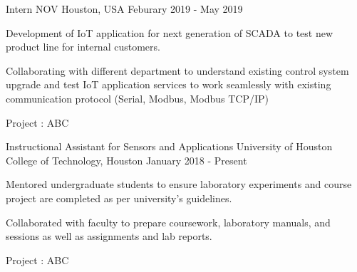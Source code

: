 \begin{cventries}
	\cventry
	{Intern} %
	{NOV} %
	{Houston, USA} %
	{Feburary 2019 - May 2019} %
	{ %
		\begin{cvitems}
			\item { Development of IoT application for next generation of SCADA to test new product line for internal customers.	} 
			\item { Collaborating with different department to understand existing control system upgrade and test IoT application services to work seamlessly with existing communication protocol (Serial, Modbus,  Modbus TCP/IP) }
		\end{cvitems}
	}
	\cvprojentry
	{Project : }
	{ABC}
\end{cventries}
\begin{cventries}
	\cventry
	{Instructional Assistant for Sensors and Applications} %
	{University of Houston} %
	{College of Technology, Houston} %
	{January 2018 - Present} %
	{ %
		\begin{cvitems}
			\item {Mentored undergraduate students to ensure laboratory experiments and course project are completed as per university's guidelines.} 
			\item {Collaborated with faculty to prepare coursework, laboratory manuals, and sessions as well as assignments and lab reports. }
		\end{cvitems}
	}
	\cvprojentry
	{Project : }
	{ABC}
\end{cventries}


